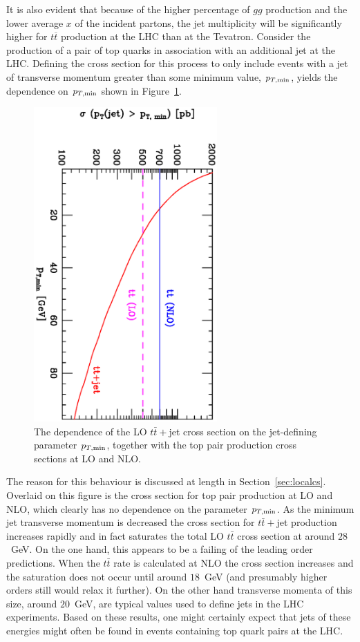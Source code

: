 \documentclass[12pt]{iopart}
\begin{document}
It is also evident that because  of the higher percentage of $gg$ production and  the lower average $x$ of the incident partons,
the jet multiplicity will be significantly higher for  $t\overline{t}$ production at the LHC than at the Tevatron. Consider the production of
a pair of top quarks in association with an additional jet at the LHC. Defining the cross section for this process to
only include events with a jet of transverse momentum greater than some minimum value, $p_{T, {\rm min}}$, yields
the dependence on $p_{T, {\rm min}}$ shown in Figure~\ref{fig:ttjet}.
%
\begin{figure}[t]
\begin{center}    
\includegraphics[width=7cm,angle=90]{ptdep_enh.ps}    
\end{center}    
\caption{The dependence of the LO $t{\bar t}+$jet cross section on the jet-defining parameter $p_{T, {\rm min}}$,
together with the top pair production cross sections at LO and NLO.}
\label{fig:ttjet}
\end{figure}
%
The reason for this behaviour is discussed at
length in Section~\ref{sec:localcs}. Overlaid on this figure is the cross section for top pair production at LO and NLO,
which clearly has no dependence on the parameter $p_{T, {\rm min}}$. As the minimum jet transverse momentum is decreased
the cross section for $t{\bar t}+$jet production increases rapidly and in fact saturates the total LO $t{\bar t}$
cross section at around $28$~GeV. On the one hand, this appears to be a failing of the leading order predictions. When the
$t{\bar t}$ rate is calculated at NLO the cross section increases and the saturation does not occur until around $18$~GeV
(and presumably higher orders still would relax it further). On the other hand transverse momenta of this size, around $20$~GeV,
are typical values used to define jets in the LHC experiments. Based on these results, one might certainly expect that jets
of these energies might often be found in events containing top quark pairs at the LHC. 
\end{document}
